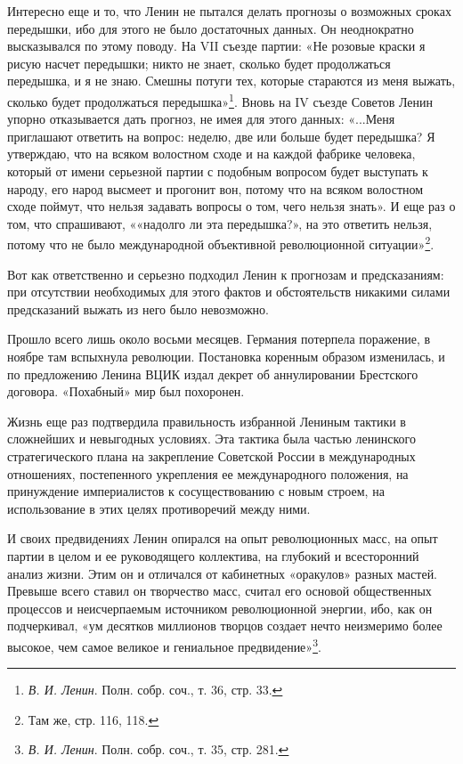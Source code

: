 \documentclass[12pt, a4paper, openany]{book}
\begin{document}
Интересно еще и то, что Ленин не пытался делать прогнозы о возможных сроках передышки, ибо для этого не было достаточных данных. Он неоднократно высказывался по этому поводу. На VII съезде партии: «Не розовые краски я рисую насчет передышки; никто не знает, сколько будет продолжаться передышка, и я не знаю. Смешны потуги тех, которые стараются из меня выжать, сколько будет продолжаться передышка»\footnote{\textit{В. И. Ленин}. Полн. собр. соч., т. 36, стр. 33.}. Вновь на IV съезде Советов Ленин упорно отказывается дать прогноз, не имея для этого данных: «...Меня приглашают ответить на вопрос: неделю, две или больше будет передышка? Я утверждаю, что на всяком волостном сходе и на каждой фабрике человека, который от имени серьезной партии с подобным вопросом будет выступать к народу, его народ высмеет и прогонит вон, потому что на всяком волостном сходе поймут, что нельзя задавать вопросы о том, чего нельзя знать». И еще раз о том, что спрашивают, ««надолго ли эта передышка?», на это ответить нельзя, потому что не было международной объективной революционной ситуации»\footnote{Там же, стр. 116, 118.}.

Вот как ответственно и серьезно подходил Ленин к прогнозам и предсказаниям: при отсутствии необходимых для этого фактов и обстоятельств никакими силами предсказаний выжать из него было невозможно.

Прошло всего лишь около восьми месяцев. Германия потерпела поражение, в ноябре там вспыхнула революции. Постановка коренным образом изменилась, и по предложению Ленина ВЦИК издал декрет об аннулировании Брестского договора. «Похабный» мир был похоронен.

Жизнь еще раз подтвердила правильность избранной Лениным тактики в сложнейших и невыгодных условиях. Эта тактика была частью ленинского стратегического плана на закрепление Советской России в международных отношениях, постепенного укрепления ее международного положения, на принуждение империалистов к сосуществованию с новым строем, на использование в этих целях противоречий между ними.

И своих предвидениях Ленин опирался на опыт революционных масс, на опыт партии в целом и ее руководящего коллектива, на глубокий и всесторонний анализ жизни. Этим он и отличался от кабинетных «оракулов» разных мастей. Превыше всего ставил он творчество масс, считал его основой общественных процессов и неисчерпаемым источником революционной энергии, ибо, как он подчеркивал, «ум десятков миллионов творцов создает нечто неизмеримо более высокое, чем самое великое и гениальное предвидение»\footnote{\textit{В. И. Ленин}. Полн. собр. соч., т. 35, стр. 281.}.
\end{document}
